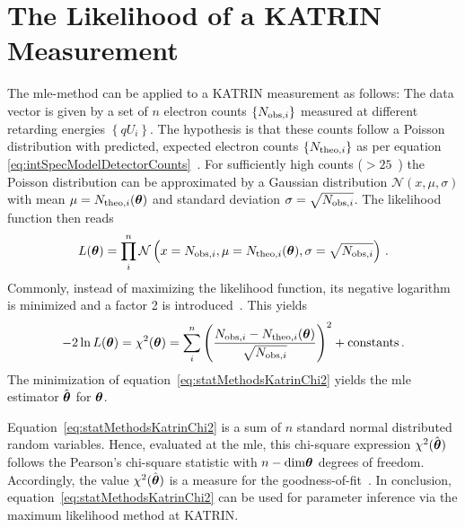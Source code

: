 \section{The Likelihood of a KATRIN Measurement}
\label{sec:statMethodsKATRINLikelihood}
The \gls{mle}-method can be applied to a KATRIN measurement as follows: The data vector is given by a set of $n$ electron counts $\left\{N_{\mathrm{obs,}i}\right\}$ measured at different retarding energies $\left\{qU_i\right\}$. The hypothesis is that these counts follow a Poisson distribution with predicted, expected electron counts $\left\{N_{\mathrm{theo,}i}\right\}$ as per equation \eqref{eq:intSpecModelDetectorCounts}~\cite{Kleesiek2014}. For sufficiently high counts ($>25$~\cite{Kleesiek2019}) the Poisson distribution can be approximated by a Gaussian distribution $\mathcal{N}(x,\mu, \sigma)$ with mean $\mu=N_{\mathrm{theo,}i}(\boldsymbol{\mathbf{\theta}})$ and standard deviation $\sigma=\sqrt{N_{\mathrm{obs,}i}}$. The likelihood function then reads~\cite{Kleesiek2014}
\begin{equation}
	\label{eq:KATRINlikelihood}
	L(\boldsymbol{\mathbf{\theta}}) = \prod_{i}^{n} \mathcal{N}\left(
		x=N_{\mathrm{obs,}i},
		\mu=N_{\mathrm{theo,}i}(\boldsymbol{\mathbf{\theta}}),
		\sigma=\sqrt{N_{\mathrm{obs,}i}}
	\right)
	\text{\,.}
\end{equation}
Commonly, instead of maximizing the likelihood function, its negative logarithm is minimized and a factor 2 is introduced~\cite{ReviewOfParticlePhysics}. This yields
\begin{equation}
	\label{eq:statMethodsKatrinChi2}
	-2\ln L(\boldsymbol{\mathbf{\theta}}) = \chi^2(\boldsymbol{\mathbf{\theta}}) = \sum_i^n
		\left( 
			\frac{N_{\mathrm{obs,}i}-N_{\mathrm{theo,}i}(\boldsymbol{\mathbf{\theta}})}{\sqrt{N_{\mathrm{obs,}i}}}
		\right)^2
		 + \mathrm{constants}
		\text{\,.}
\end{equation}
The minimization of equation~\eqref{eq:statMethodsKatrinChi2} yields the \gls{mle} estimator $\hat{\boldsymbol{\mathbf{\theta}}}$ for $\boldsymbol{\mathbf{\theta}}$.

Equation~\eqref{eq:statMethodsKatrinChi2} is a sum of $n$ standard normal distributed random variables. Hence, evaluated at the \gls{mle}, this chi-square expression $\chi^2(\hat{\boldsymbol{\mathbf{\theta}}})$ follows the Pearson's chi-square statistic with $n-\mathrm{dim}\boldsymbol{\mathbf{\theta}}$ degrees of freedom. Accordingly, the value $\chi^2(\hat{\boldsymbol{\mathbf{\theta}}})$ is a measure for the goodness-of-fit~\cite{ReviewOfParticlePhysics}. In conclusion, equation~\eqref{eq:statMethodsKatrinChi2} can be used for parameter inference via the maximum likelihood method at KATRIN.

